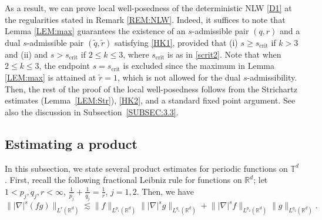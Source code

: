 \documentclass[letterpaper, 11pt,  reqno]{amsart}
\newtheorem{proposition}[theorem]{Proposition}
\newcommand{\1}{\hspace{0.5mm}\text{I}\hspace{0.5mm}}
\newcommand{\R}{\mathbb{R}}
\newcommand{\T}{\mathbb{T}}
\newcommand{\nb}{\nabla}
\newcommand{\wt}{\widetilde}
\newcommand{\les}{\lesssim}
\numberwithin{equation}{section}
\numberwithin{theorem}{section}
\begin{document}
As a result,  we can prove local well-posedness of the deterministic NLW
\eqref{D1} at the regularities stated in Remark \ref{REM:NLW}.
Indeed, it suffices to note that 
Lemma \ref{LEM:max} guarantees the existence of 
 an $s$-admissible pair $(q, r)$ and a dual $s$-admissible pair $(\wt q, \wt r)$
 satisfying \eqref{HK1},
 provided that 
  (i) $s \geq     s_\text{crit}$ if $k >3$ 
and (ii) 
and $s> s_\text{crit}$ if $ 2 \leq k \leq 3$, 
where $s_\text{crit}$ is as in \eqref{scrit2}.
Note that when $ 2 \leq k \leq 3$, 
 the endpoint $s = s_\text{crit}$ is excluded 
 since the maximum in Lemma \ref{LEM:max} is attained
 at $\wt r = 1$, which is not allowed for  the dual $s$-admissibility.
 Then, the rest of the proof of the local well-posedness follows
 from  the Strichartz estimates (Lemma~\ref{LEM:Str}), \eqref{HK2}, and 
a standard fixed point argument.
See also the discussion in Subsection~\ref{SUBSEC:3.3}.


%
%
%
%







\subsection{Estimating a product}


In this subsection, we state several product estimates
for periodic functions on $\T^d$.
First, recall the following fractional Leibniz rule
for functions on $\R^d$;
let 
 $1<p_j,q_j,r < \infty$, $\frac1{p_j} + \frac1{q_j}= \frac1r$, $j = 1, 2$. 
 Then, we have  
\begin{equation} 
\big\| |\nb|^s (fg) \big\|_{L^r(\R^d)} 
\les  \big\| f \big\|_{L^{p_1}(\R^d)} \big\| |\nb|^s g \big\|_{L^{q_1}(\R^d)} 
+ \big\| |\nb|^s f \big\|_{L^{p_2}(\R^d)}  \big\| g \big\|_{L^{q_2}(\R^d)}. 
\label{bilinear1}
\end{equation}  
\end{document}
